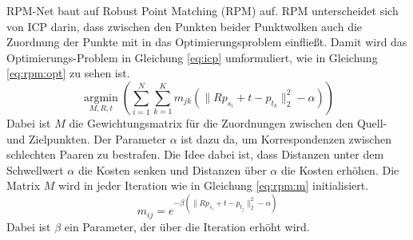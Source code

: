 \documentclass[12pt,titlepage, twoside]{article}
\begin{document}

RPM-Net baut auf Robust Point Matching (RPM) \cite{RPM} auf. RPM unterscheidet sich von ICP darin, dass zwischen den Punkten beider Punktwolken auch die Zuordnung der Punkte mit in das Optimierungsproblem einfließt.
Damit wird das Optimierungs-Problem in Gleichung \ref{eq:icp} umformuliert, wie in Gleichung \ref{eq:rpm:opt} zu sehen ist.
\begin{equation}
    \label{eq:rpm:opt}
    \underset{M,R,t}{\operatorname{argmin}}(\sum_{i=1}^N\sum_{k=1}^K{m_{jk}(\|Rp_{s_i} + t - p_{t_k}\|_2^2-\alpha)})
\end{equation}
Dabei ist $M$ die Gewichtungsmatrix für die Zuordnungen zwischen den Quell- und Zielpunkten. Der Parameter $\alpha$ ist dazu da, um Korrespondenzen zwischen schlechten Paaren zu bestrafen. 
Die Idee dabei ist, dass Distanzen unter dem Schwellwert $\alpha$ die Kosten senken und Distanzen über $\alpha$ die Kosten erhöhen.
Die Matrix $M$ wird in jeder Iteration wie in Gleichung \ref{eq:rpm:m} initialisiert.
\begin{equation}
    \label{eq:rpm:m}
    m_{ij} = e^{-\beta(\|Rp_{s_i} + t - p_{t_j}\|_2^2-\alpha)}
\end{equation}
Dabei ist $\beta$ ein Parameter, der über die Iteration erhöht wird.
\end{document}
